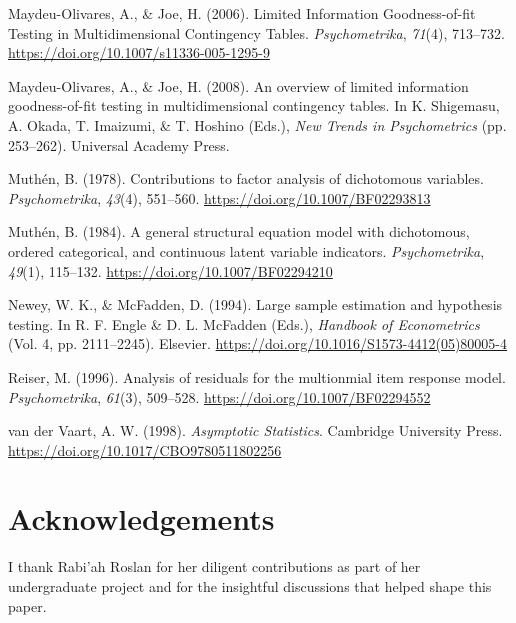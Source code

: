 \documentclass[
  letterpaper,
  DIV=11,
  numbers=noendperiod]{scrartcl}
\newlength{\cslhangindent}
\newenvironment{CSLReferences}[2] %
 {\begin{list}{}{%
  \setlength{\itemindent}{0pt}
  \setlength{\leftmargin}{0pt}
  \setlength{\parsep}{0pt}
  \ifodd #1
   \setlength{\leftmargin}{\cslhangindent}
   \setlength{\itemindent}{-1\cslhangindent}
  \fi
  \setlength{\itemsep}{#2\baselineskip}}}
 {\end{list}}
\begin{document}
\begin{CSLReferences}{1}{0}
Maydeu-Olivares, A., \& Joe, H. (2006). Limited {Information
Goodness-of-fit Testing} in {Multidimensional Contingency Tables}.
\emph{Psychometrika}, \emph{71}(4), 713--732.
\url{https://doi.org/10.1007/s11336-005-1295-9}

Maydeu-Olivares, A., \& Joe, H. (2008). An overview of limited
information goodness-of-fit testing in multidimensional contingency
tables. In K. Shigemasu, A. Okada, T. Imaizumi, \& T. Hoshino (Eds.),
\emph{New {Trends} in {Psychometrics}} (pp. 253--262). Universal Academy
Press.

Muthén, B. (1978). Contributions to factor analysis of dichotomous
variables. \emph{Psychometrika}, \emph{43}(4), 551--560.
\url{https://doi.org/10.1007/BF02293813}

Muthén, B. (1984). A general structural equation model with dichotomous,
ordered categorical, and continuous latent variable indicators.
\emph{Psychometrika}, \emph{49}(1), 115--132.
\url{https://doi.org/10.1007/BF02294210}

Newey, W. K., \& McFadden, D. (1994). Large sample estimation and
hypothesis testing. In R. F. Engle \& D. L. McFadden (Eds.),
\emph{Handbook of {Econometrics}} (Vol. 4, pp. 2111--2245). Elsevier.
\url{https://doi.org/10.1016/S1573-4412(05)80005-4}

Reiser, M. (1996). Analysis of residuals for the multionmial item
response model. \emph{Psychometrika}, \emph{61}(3), 509--528.
\url{https://doi.org/10.1007/BF02294552}

van der Vaart, A. W. (1998). \emph{Asymptotic {Statistics}}. Cambridge
University Press. \url{https://doi.org/10.1017/CBO9780511802256}

\end{CSLReferences}

\section*{Acknowledgements}\label{acknowledgements}

I thank Rabi'ah Roslan for her diligent contributions as part of her
undergraduate project and for the insightful discussions that helped
shape this paper.
\end{document}

